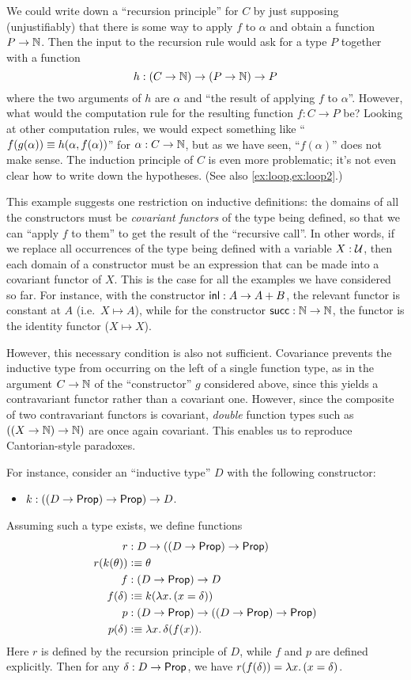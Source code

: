 We could write down a ``recursion principle'' for $C$ by just supposing (unjustifiably) that there is some way to apply $f$ to $\alpha$ and obtain a function $P\to\mathbb{N}$.
Then the input to the recursion rule would ask for a type $P$ together with a function
\begin{equation}
  h:(C\to\nat) \to (P\to\nat) \to P\label{eq:fake-recursor}
\end{equation}
where the two arguments of $h$ are $\alpha$ and ``the result of applying $f$ to $\alpha$''.
However, what would the computation rule for the resulting function $f:C\to P$ be?
Looking at other computation rules, we would expect something like ``$f(g(\alpha)) \equiv h(\alpha,f(\alpha))$'' for $\alpha:C\to\mathbb{N}$, but as we have seen, ``$f(\alpha)$'' does not make sense.
The induction principle of $C$ is even more problematic; it's not even clear how to write down the hypotheses.
(See also \autoref{ex:loop,ex:loop2}.)

This example suggests one restriction on inductive definitions: the domains of all the constructors must be \emph{covariant functors} of the type being defined, so that we can ``apply $f$ to them'' to get the result of the ``recursive call''.
In other words, if we replace all occurrences of the type being defined with a variable $X:\mathcal{U}$, then each domain of a constructor must be an expression that can be made into a covariant functor of $X$.
This is the case for all the examples we have considered so far.
For instance, with the constructor $\mathsf{inl}:A\to A+B$, the relevant functor is constant at $A$ (i.e.\ $X\mapsto A$), while for the constructor $\mathsf{succ}:\mathbb{N}\to\mathbb{N}$, the functor is the identity functor ($X\mapsto X$).

However, this necessary condition is also not sufficient.
Covariance prevents the inductive type from occurring on the left of a single function type, as in the argument $C\to\mathbb{N}$ of the ``constructor'' $g$ considered above, since this yields a contravariant functor rather than a covariant one.
However, since the composite of two contravariant functors is covariant, \emph{double} function types such as $((X\to \mathbb{N})\to \mathbb{N})$ are once again covariant.
This enables us to reproduce Cantorian-style paradoxes.

For instance, consider an ``inductive type'' $D$ with the following constructor:
\begin{itemize}
\item $k:((D\to\mathsf{Prop})\to\mathsf{Prop})\to D$.
\end{itemize}
Assuming such a type exists, we define functions
\begin{align*}
  r&:D\to ((D\to\prop)\to\prop)\\
  r(k(\theta)) &\defeq \theta\\
  f&:(D\to\prop) \to D \\
  f(\delta) &\defeq k(\lam x (x=\delta))\\
  p&:(D\to \prop) \to ((D\to\prop)\to \prop)\\
  p(\delta) &\defeq \lam x \delta(f(x)).
\end{align*}
Here $r$ is defined by the recursion principle of $D$, while $f$ and $p$ are defined explicitly.
Then for any $\delta:D\to\mathsf{Prop}$, we have $r(f(\delta)) = \lam x(x=\delta)$.


